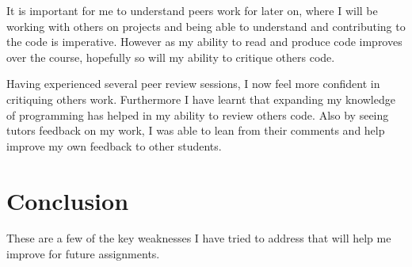 \documentclass{scrartcl}
\begin{document}
It is important for me to understand peers work for later on, where I will be working with others on projects and being able to understand and contributing to the code is imperative. However as my ability to read and produce code improves over the course, hopefully so will my ability to critique others code.

Having experienced several peer review sessions, I now feel more confident in critiquing others work. Furthermore I have learnt that expanding my knowledge of programming has helped in my ability to review others code.
Also by seeing tutors feedback on my work, I was able to lean from their comments and help improve my own feedback to other students.

\section{Conclusion}
These are a few of the key weaknesses I have tried to address that will help me improve for future assignments.
\end{document}
